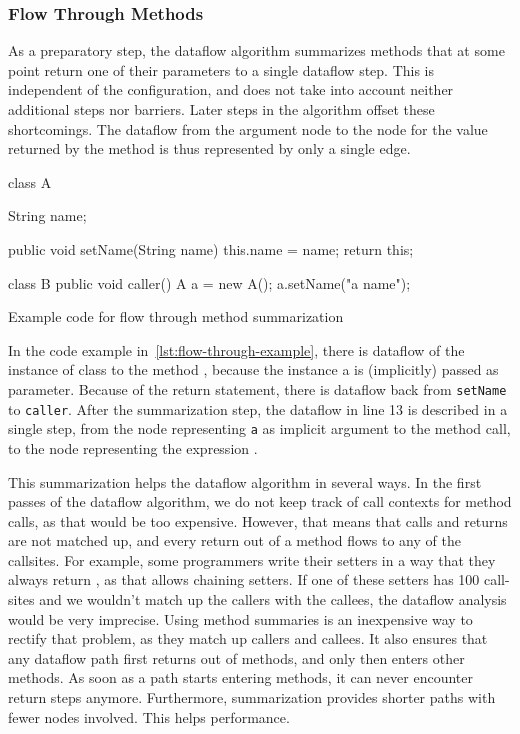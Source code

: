 \subsubsection*{Flow Through Methods}
As a preparatory step, the dataflow algorithm summarizes methods that at some point 
return one of their parameters to a single dataflow step.
This is independent of the configuration, and does not take into account
neither additional steps nor barriers.
Later steps in the algorithm offset these shortcomings.
The dataflow from the argument node to the node for the value returned by
the method is thus represented by only a single edge.
\begin{listing}[H]
    \begin{javacode}
        class A {
            String name;
        
            public void setName(String name) {
                this.name = name;
                return this;
            }
        }
    
        class B {
            public void caller() {
                A a = new A();
                a.setName("a name");
            }
        }
    \end{javacode}
    \caption{Example code for flow through method summarization}    
    \label{lst:flow-through-example}
\end{listing}
In the code example in~\autoref{lst:flow-through-example}, there is dataflow of the instance
of class  to the method , because the instance a 
is (implicitly) passed as  parameter.
Because of the return statement, there is dataflow back from \texttt{setName} to
\texttt{caller}.
After the summarization step, the dataflow in line 13 is described in a single step,
from the node representing \texttt{a} as implicit argument to the method call, to the node 
representing the expression .

This summarization helps the dataflow algorithm in several ways.
In the first passes of the dataflow algorithm, we do not keep track of call contexts
for method calls, as that would be too expensive.
However, that means that calls and returns are not matched up, and every return out of 
a method flows to any of the callsites.
For example, some programmers write their setters in a way that they always return ,
as that allows chaining setters.
If one of these setters has 100 call-sites and we wouldn't match up the callers with the callees,
the dataflow analysis would be very imprecise.
Using method summaries is an inexpensive way
to rectify that problem, as they match up callers and callees.
It also ensures that any dataflow path first returns out of methods, and only
then enters other methods. As soon as a path starts entering methods, it can 
never encounter return steps anymore.
Furthermore, summarization provides shorter paths with fewer nodes involved.
This helps performance.

